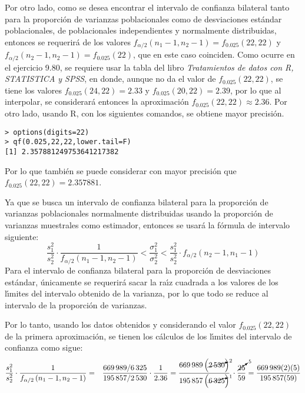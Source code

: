 \begin{solucion}
 \par
 Por otro lado, como se desea encontrar el intervalo de confianza bilateral tanto para la proporci\'on de varianzas poblacionales como de desviaciones est\'andar poblacionales, de poblacionales independientes y normalmente distribuidas, entonces se requerir\'a de los valores $f_{\alpha/2}\left( n_1 - 1, n_2 - 1 \right) = f_{0.025}(22,22)$ y $f_{\alpha/2}\left( n_2 - 1, n_2 - 1 \right) = f_{0.025}(22)$, que en este caso coinciden. Como ocurre en el ejercicio 9.80, se requiere usar la tabla del libro \textit{Tratamientos de datos con R, STATISTICA y SPSS}, en donde, aunque no da el valor de $f_{0.025}(22,22)$, se tiene los valores $f_{0.025}(24,22) = 2.33$ y $f_{0.025}(20,22) = 2.39$, por lo que al interpolar, se considerar\'a entonces la aproximaci\'on $f_{0.025}(22,22) \approx 2.36$. Por otro lado, usando R, con los siguientes comandos, se obtiene mayor precisi\'on.
 \begin{verbatim}
> options(digits=22)
> qf(0.025,22,22,lower.tail=F)
[1] 2.357881249753641217382
 \end{verbatim}
 \vspace{-0.5cm}
 Por lo que tambi\'en se puede considerar con mayor precisi\'on que $f_{0.025}(22,22)=2.357881$.
 \par 
 Ya que se busca un intervalo de confianza bilateral para la proporci\'on de varianzas poblacionales normalmente distribuidas usando la proporci\'on de varianzas muestrales como estimador, entonces se usar\'a la f\'ormula de intervalo siguiente:
 \begin{equation*}
  \frac{s_1^2}{s_2^2} \cdot \frac{1}{f_{\alpha/2}\left( n_1 - 1, n_2 - 1 \right)} < \frac{\sigma_1^2}{\sigma_2^2} < \frac{s_1^2}{s_2^2} \cdot f_{\alpha/2} \left( n_2 - 1, n_1 - 1 \right)
 \end{equation*}
 Para el intervalo de confianza bilateral para la proporci\'on de desviaciones est\'andar, \'unicamente se requerir\'a sacar la ra\'{\i}z cuadrada a los valores de los l\'{\i}mites del intervalo obtenido de la varianza, por lo que todo se reduce al intervalo de la proporci\'on de varianzas.
 \par 
 Por lo tanto, usando los datos obtenidos y considerando el valor $f_{0.025}(22,22)$ de la primera aproximaci\'on, se tienen los c\'alculos de los l\'{\i}mites del intervalo de confianza como sigue:
 \begin{eqnarray*}
  \frac{s_1^2}{s_2^2} \cdot \frac{1}{f_{\alpha/2}\left( n_1 - 1, n_2 - 1 \right)} & = & \frac{669\,989/6\,325}{195\,857/2\,530} \cdot \frac{1}{2.36} = \frac{669\,989\left(\cancelto{2}{2\,530}\right)}{195\,857 \left(\cancelto{1}{6\,325}\right)} \, \cdot \frac{\cancelto{5}{25}}{59} = \frac{669\,989(2)(5)}{195\,857(59)} \\

\end{eqnarray*}
\end{solucion}
